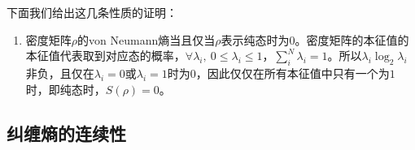 下面我们给出这几条性质的证明：

\begin{enumerate}
\item 密度矩阵$\rho$的von Neumann熵当且仅当$\rho$表示纯态时为0。密度矩阵的本征值的本征值代表取到对应态的概率，$\forall \lambda_i ,~ 0\leqslant \lambda_i \leqslant1$，$\sum_i^N \lambda_i = 1$。所以$\lambda_i \log_2 \lambda_i$非负，且仅在$\lambda_i = 0$或$\lambda_i = 1$时为$0$，因此仅仅在所有本征值中只有一个为$1$时，即纯态时，$S\left(\rho\right) = 0$。
\end{enumerate}


\subsection{纠缠熵的连续性}





